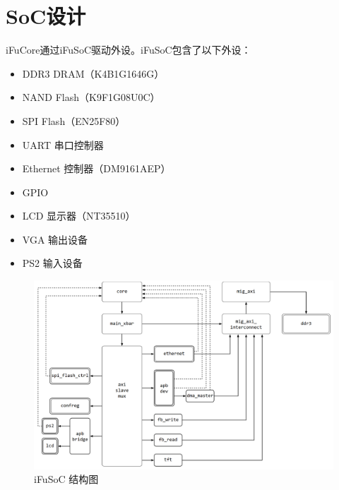 \documentclass{article}
\begin{document}
\section{SoC设计}
iFuCore通过iFuSoC驱动外设。iFuSoC包含了以下外设：\par
\begin{itemize}
    \item DDR3 DRAM（K4B1G1646G）
    \item NAND Flash（K9F1G08U0C）
    \item SPI Flash（EN25F80）
    \item UART 串口控制器
    \item Ethernet 控制器（DM9161AEP）
    \item GPIO
    \item LCD 显示器（NT35510）
    \item VGA 输出设备
    \item PS2 输入设备
\end{itemize}
\begin{figure}[h]
    \centering
    \includegraphics[width=0.5\linewidth]{./imgs/SoC.png}
    \caption{iFuSoC 结构图}
\end{figure}
\end{document}
